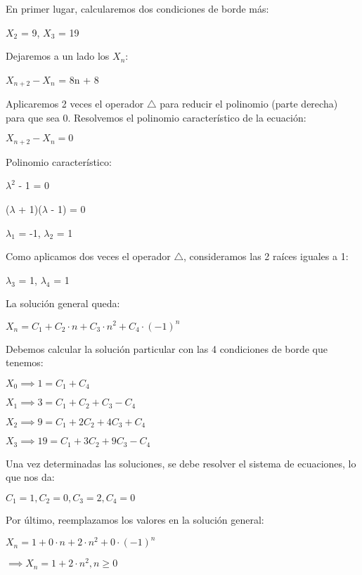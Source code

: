 \begin{solution}
  En primer lugar, calcularemos dos condiciones de borde más:
  \begin{center}
      $X_2$ = 9, $X_3$ = 19
  \end{center}
  
  Dejaremos a un lado los $X_n$:
  \begin{center}
      $X_{n+2} - X_n$ = 8n + 8
  \end{center}
  
  Aplicaremos 2 veces el operador $\bigtriangleup$ para reducir el polinomio (parte derecha) para que sea 0. Resolvemos el polinomio característico de la ecuación:
  \begin{center}
    $X_{n+2} - X_n = 0$
  
    Polinomio característico: 
    
    $\lambda^2$ - 1 = 0
    
    ($\lambda$ + 1)($\lambda$ - 1) = 0
    
    $\lambda_1$ = -1, $\lambda_2$ = 1
    
    Como aplicamos dos veces el operador $\bigtriangleup$, consideramos las 2 raíces iguales a 1:
    
    $\lambda_3$ = 1, $\lambda_4$ = 1
  \end{center}
  
  La solución general queda:
  \begin{center}
      $X_n = C_1 + C_2 \cdot n + C_3 \cdot n^2 + C_4 \cdot (-1)^n$
  \end{center}
  
  Debemos calcular la solución particular con las 4 condiciones de borde que tenemos:
  \begin{center}
      $X_0 \implies 1 = C_1 + C_4$
      
      $X_1 \implies 3 = C_1 + C_2 + C_3 - C_4$
      
      $X_2 \implies 9 = C_1 + 2C_2 + 4C_3 + C_4$
      
      $X_3 \implies 19 = C_1 + 3C_2 + 9C_3 - C_4$
  \end{center}
  
  Una vez determinadas las soluciones, se debe resolver el sistema de ecuaciones, lo que nos da:
  \begin{center}
      $C_1 = 1, C_2 = 0, C_3 = 2, C_4 = 0$
  \end{center}
  
  Por último, reemplazamos los valores en la solución general:
  \begin{center}
      $X_n = 1 + 0 \cdot n + 2 \cdot n^2 + 0 \cdot (-1)^n$
      
      $\implies X_n = 1 + 2 \cdot n^2 , n \geq 0$
  \end{center}
  
\end{solution}
